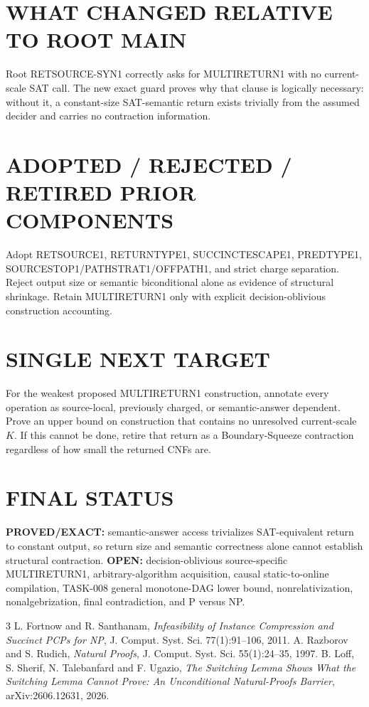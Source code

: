 \documentclass[11pt]{article}
\begin{document}
\section*{WHAT CHANGED RELATIVE TO ROOT MAIN}
Root RETSOURCE-SYN1 correctly asks for MULTIRETURN1 with no current-scale SAT call. The new exact guard proves why that clause is logically necessary: without it, a constant-size SAT-semantic return exists trivially from the assumed decider and carries no contraction information.

\section*{ADOPTED / REJECTED / RETIRED PRIOR COMPONENTS}
Adopt RETSOURCE1, RETURNTYPE1, SUCCINCTESCAPE1, PREDTYPE1, SOURCESTOP1/PATHSTRAT1/OFFPATH1, and strict charge separation. Reject output size or semantic biconditional alone as evidence of structural shrinkage. Retain MULTIRETURN1 only with explicit decision-oblivious construction accounting.

\section*{SINGLE NEXT TARGET}
For the weakest proposed MULTIRETURN1 construction, annotate every operation as source-local, previously charged, or semantic-answer dependent. Prove an upper bound on construction that contains no unresolved current-scale $K$. If this cannot be done, retire that return as a Boundary-Squeeze contraction regardless of how small the returned CNFs are.

\section*{FINAL STATUS}
\textbf{PROVED/EXACT:} semantic-answer access trivializes SAT-equivalent return to constant output, so return size and semantic correctness alone cannot establish structural contraction. \textbf{OPEN:} decision-oblivious source-specific MULTIRETURN1, arbitrary-algorithm acquisition, causal static-to-online compilation, TASK-008 general monotone-DAG lower bound, nonrelativization, nonalgebrization, final contradiction, and P versus NP.

\begin{thebibliography}{3}
 L. Fortnow and R. Santhanam, \emph{Infeasibility of Instance Compression and Succinct PCPs for NP}, J. Comput. Syst. Sci. 77(1):91--106, 2011.
 A. Razborov and S. Rudich, \emph{Natural Proofs}, J. Comput. Syst. Sci. 55(1):24--35, 1997.
 B. Loff, S. Sherif, N. Talebanfard and F. Ugazio, \emph{The Switching Lemma Shows What the Switching Lemma Cannot Prove: An Unconditional Natural-Proofs Barrier}, arXiv:2606.12631, 2026.
\end{thebibliography}
\end{document}
